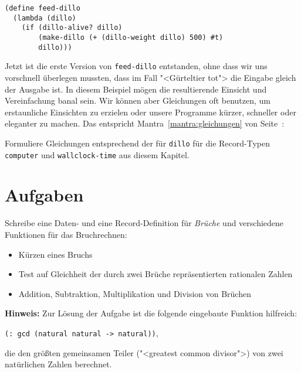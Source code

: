 %
\begin{lstlisting}
(define feed-dillo
  (lambda (dillo)
    (if (dillo-alive? dillo)
        (make-dillo (+ (dillo-weight dillo) 500) #t)
        dillo)))
\end{lstlisting}
%
Jetzt ist die erste Version von \lstinline{feed-dillo} entstanden, ohne
dass wir uns vorschnell überlegen mussten, dass im Fall "<Gürteltier
tot"> die Eingabe gleich der Ausgabe ist.  In diesem Beispiel mögen die
resultierende Einsicht und Vereinfachung banal sein.  Wir können aber
Gleichungen oft benutzen, um erstaunliche Einsichten zu erzielen oder
unsere Programme kürzer, schneller oder eleganter zu machen.  Das
entspricht Mantra~\ref{mantra:gleichungen} von
Seite~\pageref{mantra:gleichungen}:
%
\mantragleichungen*

\begin{aufgabeinline}
  Formuliere Gleichungen entsprechend der für \lstinline{dillo} für die
  Record-Typen \lstinline{computer} und \lstinline{wallclock-time} aus
  diesem Kapitel.
\end{aufgabeinline}

\section*{Aufgaben}

\begin{aufgabe}
  Schreibe eine Daten- und eine
  Record-Definition für \textit{Brüche} und verschiedene Funktionen
  für das Bruchrechnen:
  \begin{itemize}
  \item Kürzen eines Bruchs
  \item Test auf Gleichheit der durch zwei Brüche repräsentierten
    rationalen Zahlen
  \item Addition, Subtraktion, Multiplikation und Division von
    Brüchen
  \end{itemize}
%
  \textbf{Hinweis:} Zur Lösung der Aufgabe ist die folgende eingebaute
  Funktion hilfreich:
  \begin{center}
    \lstinline{(: gcd (natural natural -> natural))},
  \end{center}
  die den größten gemeinsamen Teiler ("<greatest common divisor">) von
  zwei natürlichen Zahlen berechnet.

\end{aufgabe}

